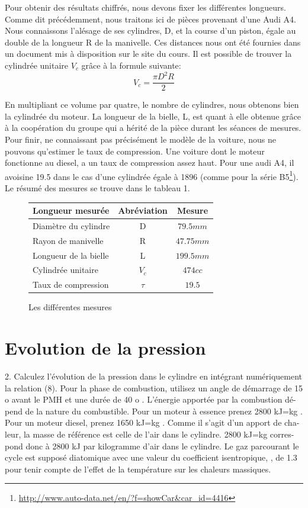 \documentclass[a4paper,oneside,12pt]{report}
\begin{document}
Pour obtenir des résultats chiffrés, nous devons fixer les différentes longueurs. Comme dit précédemment, nous traitons ici de pièces provenant d'une Audi A4. Nous connaissons l'alésage de ses cylindres, D, et la course d'un piston, égale au double de la longueur R de la manivelle. Ces distances nous ont été fournies dans un document mis à disposition sur le site du cours. Il est possible de trouver la cylindrée unitaire $V_c$ grâce à la formule suivante: 
$$V_c =\frac{\pi D^2 R}{2}$$

En multipliant ce volume par quatre, le nombre de cylindres, nous obtenons bien la cylindrée du moteur. La longueur de la bielle, L, est quant à elle obtenue grâce à la coopération du groupe qui a hérité de la pièce durant les séances de mesures. Pour finir, ne connaissant pas précisément le modèle de la voiture, nous ne pouvons qu'estimer le taux de compression. Une voiture dont le moteur fonctionne au diesel, a un taux de compression assez haut. Pour une audi A4, il avoisine 19.5 dans le cas d'une cylindrée égale à 1896 (comme pour la série 
B5\footnote{\url{http://www.auto-data.net/en/?f=showCar&car_id=4416}}). Le résumé des mesures se trouve dans le tableau 1.

\begin{figure}[h]
\centering
\begin{tabular}{|l|c|c|}
  \hline
  Longueur mesurée & Abréviation & Mesure\\
  \hline
  Diamètre du cylindre & D & $79.5mm$ \\
  Rayon de manivelle & R & $47.75mm$\\
  Longueur de la bielle & L & $199.5mm$\\
  Cylindrée unitaire & $V_c$  & $474cc$\\
  Taux de compression & $\tau$ & $19.5$\\
  \hline
\end{tabular}
\caption{Les différentes mesures}
\end{figure}

\section{Evolution de la pression}
2. Calculez l’évolution de la pression dans le cylindre en intégrant numériquement
la relation (8). Pour la phase de combustion, utilisez un angle de démarrage de
15
o
avant le PMH et une durée de
40
o
. L’énergie apportée par la combustion dé-
pend de la nature du combustible. Pour un moteur à essence prenez
2800
kJ=kg
.
Pour un moteur diesel, prenez
1650
kJ=kg
. Comme il s’agit d’un apport de cha-
leur, la masse de référence est celle de l’air dans le cylindre.
2800
kJ=kg
corres-
pond donc à
2800
kJ
par kilogramme d’air dans le cylindre. Le gaz parcourant
le cycle est supposé diatomique avec une valeur du coefficient isentropique,
,
de 1.3 pour tenir compte de l’effet de la température sur les chaleurs massiques.
\end{document}
